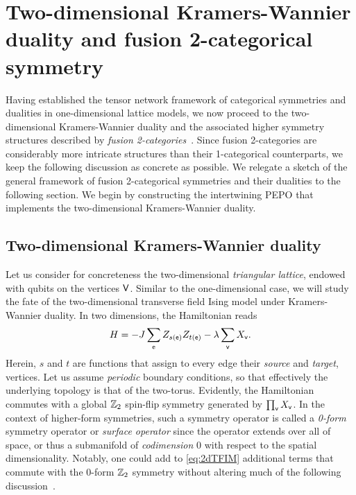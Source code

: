 \section{Two-dimensional Kramers-Wannier duality and fusion 2-categorical symmetry}
Having established the tensor network framework of categorical symmetries and dualities in one-dimensional lattice models, we now proceed to the two-dimensional Kramers-Wannier duality and the associated higher symmetry structures described by \emph{fusion 2-categories}~\cite{Wegner1971,Haegeman2014a,Douglas2018,Delcamp2023,Decoppet2024}. Since fusion 2-categories are considerably more intricate structures than their 1-categorical counterparts, we keep the following discussion as concrete as possible. We relegate a sketch of the general framework of fusion 2-categorical symmetries and their dualities to the following section. We begin by constructing the intertwining PEPO that implements the two-dimensional Kramers-Wannier duality.
\subsection{Two-dimensional Kramers-Wannier duality}
Let us consider for concreteness the two-dimensional \emph{triangular lattice}, endowed with qubits on the vertices $\mathsf{V}$. Similar to the one-dimensional case, we will study the fate of the two-dimensional transverse field Ising model under Kramers-Wannier duality. In two dimensions, the Hamiltonian reads
\begin{equation}\label{eq:2dTFIM}
	H = -J\sum_{\mathsf{e}} Z_{s(\mathsf{e})}Z_{t(\mathsf{e})} - \lambda \sum_{\mathsf{v}} X_{\mathsf{v}}.
\end{equation}
Herein, $s$ and $t$ are functions that assign to every edge their \emph{source} and \emph{target}, vertices. Let us assume \emph{periodic} boundary conditions, so that effectively the underlying topology is that of the two-torus. Evidently, the Hamiltonian commutes with a global $\mathbb Z_2$ spin-flip symmetry generated by $\prod_{\mathsf{v}} X_{\mathsf{v}}$. In the context of higher-form symmetries, such a symmetry operator is called a \emph{0-form} symmetry operator or \emph{surface operator} since the operator extends over all of space, or thus a submanifold of  \emph{codimension} 0 with respect to the spatial dimensionality. Notably, one could add to \cref{eq:2dTFIM} additional terms that commute with the 0-form $\mathbb Z_2$ symmetry without altering much of the following discussion~\cite{Delcamp2023}.

